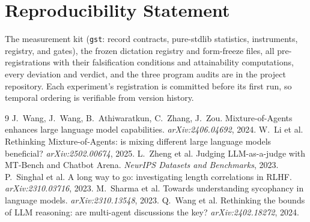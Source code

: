 \documentclass[11pt]{article}
\begin{document}
\section*{Reproducibility Statement}

The measurement kit (\texttt{gst}: record contracts, pure-stdlib
statistics, instruments, registry, and gates), the frozen dictation
registry and form-freeze files, all pre-registrations with their
falsification conditions and attainability computations, every
deviation and verdict, and the three program audits are in the project
repository. Each experiment's registration is committed before its
first run, so temporal ordering is verifiable from version history.

\begin{thebibliography}{9}
 J.~Wang, J.~Wang, B.~Athiwaratkun, C.~Zhang,
J.~Zou. Mixture-of-Agents enhances large language model capabilities.
\emph{arXiv:2406.04692}, 2024.
 W.~Li et al. Rethinking Mixture-of-Agents: is
mixing different large language models beneficial?
\emph{arXiv:2502.00674}, 2025.
 L.~Zheng et al. Judging LLM-as-a-judge with
MT-Bench and Chatbot Arena. \emph{NeurIPS Datasets and Benchmarks},
2023.
 P.~Singhal et al. A long way to go:
investigating length correlations in RLHF. \emph{arXiv:2310.03716},
2023.
 M.~Sharma et al. Towards understanding
sycophancy in language models. \emph{arXiv:2310.13548}, 2023.
 Q.~Wang et al. Rethinking the bounds of LLM
reasoning: are multi-agent discussions the key? \emph{arXiv:2402.18272},
2024.
\end{thebibliography}
\end{document}
